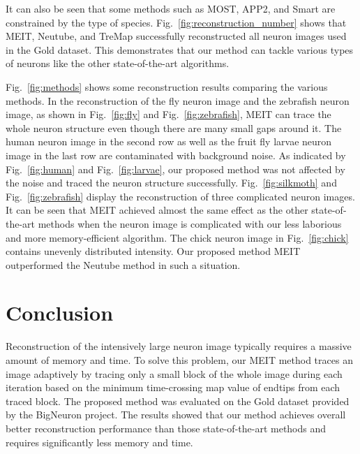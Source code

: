 \documentclass[conference]{IEEEtran}
\begin{document}
It can also be seen that some methods such as MOST, APP2, and Smart are constrained by the type of species. Fig.~\ref{fig:reconstruction_number} shows that MEIT, Neutube, and TreMap successfully reconstructed all neuron images used in the Gold dataset. This demonstrates that our method can tackle various types of neurons like the other state-of-the-art algorithms.

Fig.~\ref{fig:methods} shows some reconstruction results comparing the various methods. In the reconstruction of the fly neuron image and the zebrafish neuron image, as shown in Fig.~\ref{fig:fly} and Fig.~\ref{fig:zebrafish}, MEIT can trace the whole neuron structure even though there are many small gaps around it. The human neuron image in the second row as well as the fruit fly larvae neuron image in the last row are contaminated with background noise. As indicated by Fig.~\ref{fig:human} and Fig.~\ref{fig:larvae}, our proposed method was not affected by the noise and traced the neuron structure successfully. Fig.~\ref{fig:silkmoth} and Fig.~\ref{fig:zebrafish} display the reconstruction of three complicated neuron images. It can be seen that MEIT achieved almost the same effect as the other state-of-the-art methods when the neuron image is complicated with our less laborious and more memory-efficient algorithm. The chick neuron image in Fig.~\ref{fig:chick} contains unevenly distributed intensity. Our proposed method MEIT outperformed the Neutube method in such a situation. 




\section{Conclusion}
Reconstruction of the intensively large neuron image typically requires a massive amount of memory and time. To solve this problem, our MEIT method traces an image adaptively by tracing only a small block of the whole image during each iteration based on the minimum time-crossing map value of endtips from each traced block. The proposed method was evaluated on the Gold dataset provided by the BigNeuron project. The results showed that our method achieves overall better reconstruction performance than those state-of-the-art methods and requires significantly less memory and time.





\end{document}
